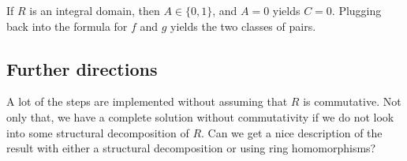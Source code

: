 If $R$ is an integral domain, then $A \in \{0, 1\}$, and $A = 0$ yields $C = 0$.
Plugging back into the formula for $f$ and $g$ yields the two classes of pairs.



\subsection*{Further directions}

A lot of the steps are implemented without assuming that $R$ is commutative.
Not only that, we have a complete solution without commutativity if we do not look into some structural decomposition of $R$.
Can we get a nice description of the result with either a structural decomposition or using ring homomorphisms?
